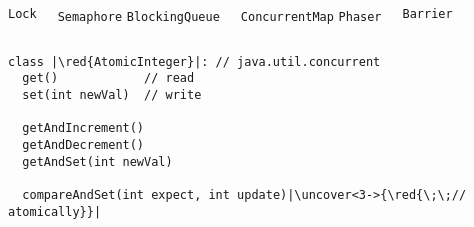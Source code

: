 
\begin{frame}{}
\end{frame}

\begin{frame}{}
    {\vspace{0.30cm}\centerline{\Large {}}}
\end{frame}

\begin{frame}{}
    {\vspace{0.30cm}\centerline{\Large {}}}
\end{frame}

\begin{frame}{}
  \begin{columns}
  \end{columns}

  \vspace{1.00cm}
  \centerline{\Large {}}
\end{frame}

\begin{frame}[fragile]{}
  \begin{columns}
      \texttt{\quad\qquad Lock}

      \texttt{\quad\qquad Semaphore}
      \texttt{\quad BlockingQueue}
      
      \texttt{\quad ConcurrentMap}
      \texttt{\qquad Phaser}

      \texttt{\qquad Barrier}
  \end{columns}

  \pause
  \vspace{0.50cm}
  \begin{lstlisting}[style = CStyle]
class |\red{AtomicInteger}|: // java.util.concurrent
  get()            // read
  set(int newVal)  // write

  getAndIncrement()
  getAndDecrement()
  getAndSet(int newVal)

  compareAndSet(int expect, int update)|\uncover<3->{\red{\;\;// atomically}}|
  \end{lstlisting}
\end{frame}

